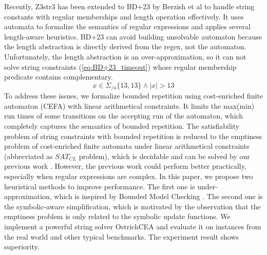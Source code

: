 {Recently, Z3str3 has been extended to BD+23\cite{BD+23} by Berzish et al to handle string constants with regular memberships and length operation effectively. It uses automata to formalize the semantics of regular expressions and applies several length-aware heuristics. BD+23 can avoid building unsolvable automaton because the length abstraction is directly derived from the regex, not the automaton. Unfortunately, the length abstraction is an over-approximation, so it can not solve string constraints (\ref{eq:BD+23_timeout}) whose regular membership predicate contains complementary.
\begin{equation}\label{eq:BD+23_timeout}
  x\in \Sigma_{/a}\{13,13\}\wedge |x| > 13
\end{equation}
To address these issues, we formalize bounded repetition using cost-enriched finite automaton (CEFA)\cite{atva2020} with linear arithmetical constraints. It limits the max(min) run times of some transitions on the accepting run of the automaton, which completely captures the semantics of bounded repetition. The satisfiability problem of string constraints with bounded repetition is reduced to the emptiness problem of cost-enriched finite automata under linear arithmetical constraints (abbreviated as $SAT_{CL}$ problem), which is decidable and can be solved by our previous work \cite{atva2020}. However, the previous work could perform better practically, especially when regular expressions are complex. In this paper, we propose two heuristical methods to improve performance. The first one is under-approximation, which is inspired by Bounded Model Checking \cite{bmc_1}\cite{bmc_2}\cite{bmc_3}. The second one is the symbolic-aware simplification, which is motivated by the observation that the emptiness problem is only related to the symbolic update functions. We implement a powerful string solver OstrichCEA and evaluate it on instances from the real world and other typical benchmarks. The experiment result shows superiority.

}
